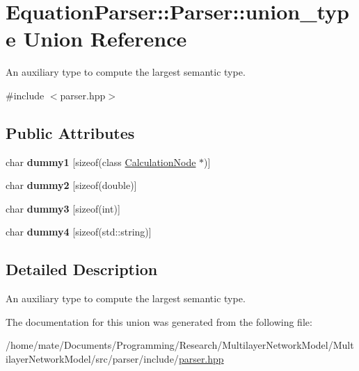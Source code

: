 \hypertarget{unionEquationParser_1_1Parser_1_1union__type}{}\section{Equation\+Parser\+:\+:Parser\+:\+:union\+\_\+type Union Reference}
\label{unionEquationParser_1_1Parser_1_1union__type}


An auxiliary type to compute the largest semantic type.  




{\ttfamily \#include $<$parser.\+hpp$>$}

\subsection*{Public Attributes}
\begin{DoxyCompactItemize}
\item 
char {\bfseries dummy1} \mbox{[}sizeof(class \hyperlink{classCalculationNode}{Calculation\+Node} $\ast$)\mbox{]}\hypertarget{unionEquationParser_1_1Parser_1_1union__type_aad74e0328cfdb9d46e8ba0b6552cfe80}{}\label{unionEquationParser_1_1Parser_1_1union__type_aad74e0328cfdb9d46e8ba0b6552cfe80}

\item 
char {\bfseries dummy2} \mbox{[}sizeof(double)\mbox{]}\hypertarget{unionEquationParser_1_1Parser_1_1union__type_ad29f0f3c2610dd9ac9e70e460742987b}{}\label{unionEquationParser_1_1Parser_1_1union__type_ad29f0f3c2610dd9ac9e70e460742987b}

\item 
char {\bfseries dummy3} \mbox{[}sizeof(int)\mbox{]}\hypertarget{unionEquationParser_1_1Parser_1_1union__type_a32ffa918357d6108417a051e004fa286}{}\label{unionEquationParser_1_1Parser_1_1union__type_a32ffa918357d6108417a051e004fa286}

\item 
char {\bfseries dummy4} \mbox{[}sizeof(std\+::string)\mbox{]}\hypertarget{unionEquationParser_1_1Parser_1_1union__type_a8426f83196a08e2010f24aa6630efc92}{}\label{unionEquationParser_1_1Parser_1_1union__type_a8426f83196a08e2010f24aa6630efc92}

\end{DoxyCompactItemize}


\subsection{Detailed Description}
An auxiliary type to compute the largest semantic type. 

The documentation for this union was generated from the following file\+:\begin{DoxyCompactItemize}
\item 
/home/mate/\+Documents/\+Programming/\+Research/\+Multilayer\+Network\+Model/\+Multilayer\+Network\+Model/src/parser/include/\hyperlink{parser_8hpp}{parser.\+hpp}\end{DoxyCompactItemize}
